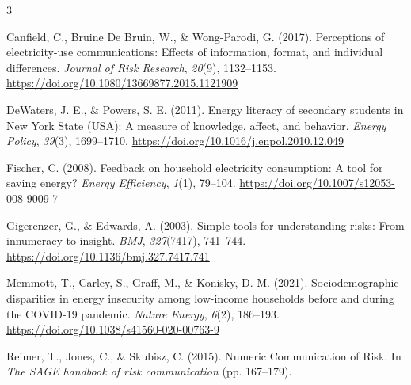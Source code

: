 \documentclass[
  12pt,
]{article}
\newlength{\cslhangindent}
\newenvironment{CSLReferences}[2] %
 {\begin{list}{}{%
  \setlength{\itemindent}{0pt}
  \setlength{\leftmargin}{0pt}
  \setlength{\parsep}{0pt}
  \ifodd #1
   \setlength{\leftmargin}{\cslhangindent}
   \setlength{\itemindent}{-1\cslhangindent}
  \fi
  \setlength{\itemsep}{#2\baselineskip}}}
 {\end{list}}
\begin{document}
\begin{multicols}{3}
\begin{CSLReferences}{1}{0}
Canfield, C., Bruine De Bruin, W., \& Wong-Parodi, G. (2017).
Perceptions of electricity-use communications: Effects of information,
format, and individual differences. \emph{Journal of Risk Research},
\emph{20}(9), 1132--1153.
\url{https://doi.org/10.1080/13669877.2015.1121909}

DeWaters, J. E., \& Powers, S. E. (2011). Energy literacy of secondary
students in {New York State} ({USA}): {A} measure of knowledge, affect,
and behavior. \emph{Energy Policy}, \emph{39}(3), 1699--1710.
\url{https://doi.org/10.1016/j.enpol.2010.12.049}

Fischer, C. (2008). Feedback on household electricity consumption: A
tool for saving energy? \emph{Energy Efficiency}, \emph{1}(1), 79--104.
\url{https://doi.org/10.1007/s12053-008-9009-7}

Gigerenzer, G., \& Edwards, A. (2003). Simple tools for understanding
risks: From innumeracy to insight. \emph{BMJ}, \emph{327}(7417),
741--744. \url{https://doi.org/10.1136/bmj.327.7417.741}

Memmott, T., Carley, S., Graff, M., \& Konisky, D. M. (2021).
Sociodemographic disparities in energy insecurity among low-income
households before and during the {COVID-19} pandemic. \emph{Nature
Energy}, \emph{6}(2), 186--193.
\url{https://doi.org/10.1038/s41560-020-00763-9}

Reimer, T., Jones, C., \& Skubisz, C. (2015). Numeric {Communication} of
{Risk}. In \emph{The {SAGE} handbook of risk communication} (pp.
167--179).

\end{CSLReferences}




\end{multicols} %
\end{document}

